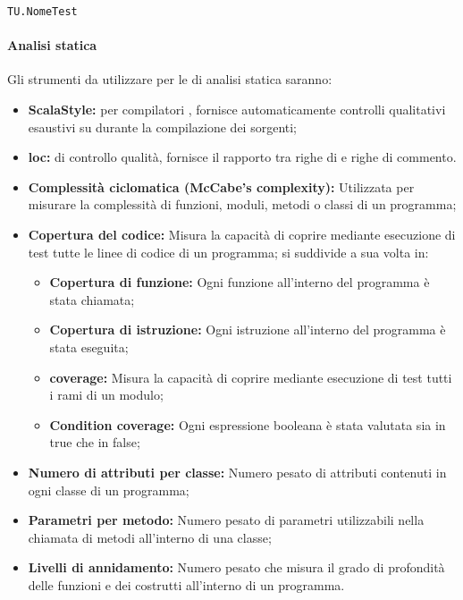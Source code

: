 \documentclass{scalatekids-article}
\begin{document}
\begin{center}
  \verb=TU.NomeTest=
\end{center}

\paragraph{Analisi statica}
\label{sec:AnalisiStatica}

Gli strumenti da utilizzare per le  di analisi statica saranno:
\begin{itemize}
\item\textbf{ScalaStyle:}  per compilatori , fornisce automaticamente controlli qualitativi esaustivi su  durante la compilazione dei sorgenti;
\item\textbf{loc:}  di controllo qualità, fornisce il rapporto tra righe di  e righe di commento.
\item\textbf{Complessità ciclomatica (McCabe's complexity):} Utilizzata per
  misurare la complessità di funzioni, moduli, metodi o classi di un
  programma;
\item\textbf{Copertura del codice:} Misura la capacità di coprire mediante
  esecuzione di test tutte le linee di codice di un programma; si
  suddivide a sua volta in:
  \begin{itemize}
  \item\textbf{Copertura di funzione:} Ogni funzione all'interno del
    programma è stata chiamata;
  \item\textbf{Copertura di istruzione:} Ogni istruzione all'interno
    del programma è stata eseguita;
  \item\textbf{ coverage:} Misura la capacità di coprire
    mediante esecuzione di test tutti i rami di un modulo;
  \item\textbf{Condition coverage:} Ogni espressione booleana è stata
    valutata sia in true che in false;
  \end{itemize}
\item\textbf{Numero di attributi per classe:} Numero pesato di attributi
  contenuti in ogni classe di un programma;
\item\textbf{Parametri per metodo:} Numero pesato di parametri utilizzabili
  nella chiamata di metodi all'interno di una classe;
\item\textbf{Livelli di annidamento:} Numero pesato che misura il grado di
  profondità delle funzioni e dei costrutti all'interno di un programma.
\end{itemize}
\end{document}
